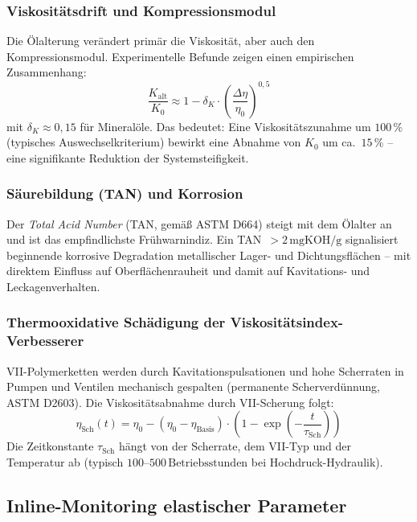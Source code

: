 ﻿\documentclass[a4paper,12pt]{scrreprt}
\theoremstyle{definition}
\begin{document}
\subsubsection{Viskositätsdrift und Kompressionsmodul}

Die Ölalterung verändert primär die Viskosität, aber auch den
Kompressionsmodul. Experimentelle Befunde zeigen einen empirischen
Zusammenhang:
\begin{equation}
  \frac{K_{\mathrm{alt}}}{K_0} \approx 1 - \delta_K \cdot
    \left(\frac{\Delta\eta}{\eta_0}\right)^{0{,}5}
  \label{eq:k_alterung}
\end{equation}
mit $\delta_K \approx 0{,}15$ für Mineralöle. Das bedeutet: Eine
Viskositätszunahme um $100\,\%$ (typisches Auswechselkriterium) bewirkt
eine Abnahme von $K_0$ um ca.\ $15\,\%$ -- eine signifikante Reduktion
der Systemsteifigkeit.

\subsubsection{Säurebildung (TAN) und Korrosion}

Der \emph{Total Acid Number} (TAN, gemäß ASTM D664) steigt mit dem
Ölalter an und ist das empfindlichste Frühwarnindiz. Ein TAN~$> 2\,\mathrm{mgKOH/g}$
signalisiert beginnende korrosive Degradation metallischer Lager- und
Dichtungsflächen -- mit direktem Einfluss auf Oberflächenrauheit und
damit auf Kavitations- und Leckagenverhalten.

\subsubsection{Thermooxidative Schädigung der Viskositätsindex-Verbesserer}

VII-Polymerketten werden durch Kavitationspulsationen und hohe Scherraten
in Pumpen und Ventilen mechanisch gespalten (permanente Scherverdünnung,
ASTM D2603). Die Viskositätsabnahme durch VII-Scherung folgt:
\begin{equation}
  \eta_{\mathrm{Sch}}(t) = \eta_0 - (\eta_0 - \eta_{\mathrm{Basis}}) \cdot
    \left(1 - \exp\!\left(-\frac{t}{\tau_{\mathrm{Sch}}}\right)\right)
  \label{eq:vii_scherung}
\end{equation}
Die Zeitkonstante $\tau_{\mathrm{Sch}}$ hängt von der Scherrate, dem
VII-Typ und der Temperatur ab (typisch $100$--$500\,\mathrm{Betriebsstunden}$
bei Hochdruck-Hydraulik).

\subsection{Inline-Monitoring elastischer Parameter}
\end{document}
